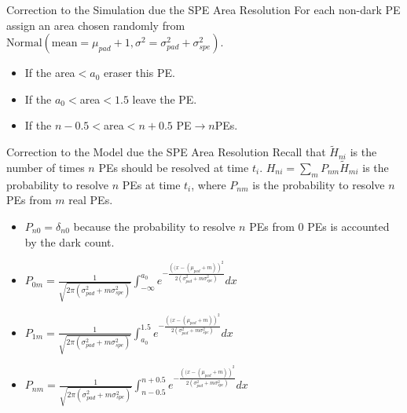 \documentclass{beamer}
\begin{document}
\begin{frame}{Correction to the Simulation due the SPE Area Resolution}
For each non-dark PE assign an area chosen randomly from $\text{Normal}\left(\text{mean}=\mu_{pad}+1, \sigma^2=\sigma_{pad}^2+\sigma_{spe}^2\right)$.\\
\begin{itemize}
\item If the area$<a_0$ eraser this PE.\\
\item If the $a_0<$area$<1.5$ leave the PE.\\
\item If the $n-0.5<$area$<n+0.5$ PE$\rightarrow n$PEs.
\end{itemize}

\end{frame}


\begin{frame}{Correction to the Model due the SPE Area Resolution}
Recall that $\tilde{H}_{ni}$ is the number of times $n$ PEs should be resolved at time $t_i$.
$H_{ni}=\sum_mP_{nm}\tilde{H}_{mi}$ is the probability to resolve $n$ PEs at time $t_i$, where $P_{nm}$ is the probability to resolve $n$ PEs from $m$ real PEs.\\
\begin{itemize}
\item $P_{n0}=\delta_{n0}$ because the probability to resolve $n$ PEs from 0 PEs is accounted by the dark count.
\item $P_{0m}=\frac{1}{\sqrt{2\pi\left(\sigma_{pad}^2+m\sigma_{spe}^2\right)}}\int_{-\infty}^{a_0}e^{-\frac{\left((x-(\mu_{pad}+m)\right)^2}{2\left(\sigma_{pad}^2+m\sigma_{spe}^2\right)}}dx$\\
\item $P_{1m}=\frac{1}{\sqrt{2\pi\left(\sigma_{pad}^2+m\sigma_{spe}^2\right)}}\int_{a_0}^{1.5}e^{-\frac{\left((x-(\mu_{pad}+m)\right)^2}{2\left(\sigma_{pad}^2+m\sigma_{spe}^2\right)}}dx$\\
\item $P_{nm}=\frac{1}{\sqrt{2\pi\left(\sigma_{pad}^2+m\sigma_{spe}^2\right)}}\int_{n-0.5}^{n+0.5}e^{-\frac{\left((x-(\mu_{pad}+m)\right)^2}{2\left(\sigma_{pad}^2+m\sigma_{spe}^2\right)}}dx$\\
\end{itemize}
\end{frame}
\end{document}
